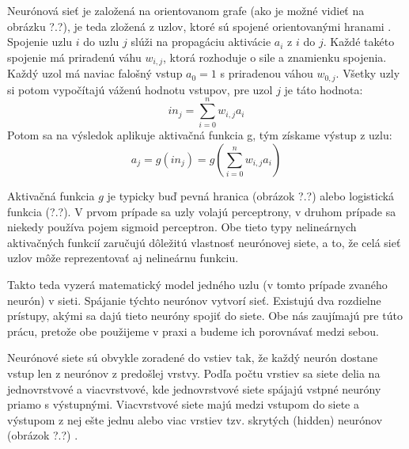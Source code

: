 \fi

\iffalse
Neural networks are composed of nodes or units (see Figure 18.19) connected by directed links. 
A link from unit i to unit j serves to propagate the activation $a_i$ from i to j.
Each link also has a numeric weight $w_{i,j}$ associated with it, which determines the strength and sign of the connection. 
Just as in linear regression models, each unit has a dummy input $a_0=1$ with an associated weight $w_{0,j}$. 
Each unit j first computes a weighted sum of its inputs: $$in_j=\sum^n_{i=0}w_{i,j}a_i$$
Then it applies an activation function g to this sum to derive the output: 
$$a_j=g(in_j)=g\left(\sum^n_{i=0}w_{i,j}a_i\right)$$
\fi

Neurónová sieť je založená na orientovanom grafe (ako je možné vidieť na obrázku ?.?), je teda zložená z uzlov, ktoré sú spojené orientovanými hranami \citep{rnn:spol}.
Spojenie uzlu $i$ do uzlu $j$ slúži na propagáciu aktivácie $a_i$ z $i$ do $j$.
Každé takéto spojenie má priradenú váhu $w_{i,j}$, ktorá rozhoduje o sile a znamienku spojenia.
Každý uzol má naviac falošný vstup $a_0=1$ s priradenou váhou $w_{0,j}$.
Všetky uzly si potom vypočítajú váženú hodnotu vstupov, pre uzol $j$ je táto hodnota:
$$in_j=\sum^n_{i=0}w_{i,j}a_i$$
Potom sa na výsledok aplikuje aktivačná funkcia g, tým získame výstup z uzlu:
$$a_j=g(in_j)=g\left(\sum^n_{i=0}w_{i,j}a_i\right)$$

Aktivačná funkcia $g$ je typicky buď pevná hranica (obrázok ?.?) alebo logistická funkcia (?.?).
V prvom prípade sa uzly volajú perceptrony, v druhom prípade sa niekedy používa pojem sigmoid perceptron.
Obe tieto typy nelineárnych aktivačných funkcií zaručujú dôležitú vlastnosť neurónovej siete, a to, že celá sieť uzlov môže reprezentovať aj nelineárnu funkciu.

Takto teda vyzerá matematický model jedného uzlu (v tomto prípade zvaného neurón) v sieti.
Spájanie týchto neurónov vytvorí sieť.
Existujú dva rozdielne prístupy, akými sa dajú tieto neuróny spojiť do siete. 
Obe nás zaujímajú pre túto prácu, pretože obe použijeme v praxi a budeme ich porovnávať medzi sebou.

Neurónové siete sú obvykle zoradené do vstiev tak, že každý neurón dostane vstup len z neurónov z predošlej vrstvy.
Podľa počtu vrstiev sa siete delia na jednovrstvové a viacvrstvové, kde jednovrstvové siete spájajú vstpné neuróny priamo s výstupnými.
Viacvrstvové siete majú medzi vstupom do siete a výstupom z nej ešte jednu alebo viac vrstiev tzv. skrytých (hidden) neurónov (obrázok ?.?) \citep{aima}.

